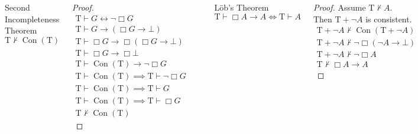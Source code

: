 \documentclass[UTF8,11pt,colorlinks,compress,openany]{beamer}%
\begin{document}
\begin{frame}\frametitle{}
\setlength\abovedisplayskip{0pt}
\setlength\belowdisplayskip{0pt}
	\begin{columns}
		\begin{block}{Second Incompleteness Theorem}
			\[\mathrm{T}\nvdash\operatorname{Con}(\mathrm{T})\]
		\end{block}
		\vspace{-1ex}
		\begin{proof}
			\begin{gather*}
			\mathrm{T}\vdash G\leftrightarrow\neg\Box G\\
			\mathrm{T}\vdash G\to(\Box G\to\bot)\\
			\mathrm{T}\vdash\Box G\to\Box (\Box G\to\bot)\\
			\mathrm{T}\vdash\Box G\to\Box \bot\\
			\mathrm{T}\vdash\operatorname{Con}(\mathrm{T})\to\neg\Box G\\
			\mathrm{T}\vdash\operatorname{Con}(\mathrm{T})\implies\mathrm{T}\vdash\neg\Box G\\
			\mathrm{T}\vdash\operatorname{Con}(\mathrm{T})\implies\mathrm{T}\vdash G\\
			\mathrm{T}\vdash\operatorname{Con}(\mathrm{T})\implies\mathrm{T}\vdash\Box G\\
			\mathrm{T}\nvdash\operatorname{Con}(\mathrm{T})
			\end{gather*}
		\end{proof}
		\begin{center}
		\end{center}
		\begin{block}{L\"ob's Theorem}
			\[\mathrm{T}\vdash\Box A\to A\iff\mathrm{T}\vdash A\]
		\end{block}
		\begin{proof}
			Assume $\mathrm{T}\nvdash A$.\\
			Then $\mathrm{T}+\neg A$ is consistent.
			\begin{gather*}
			\mathrm{T}+\neg A\nvdash\operatorname{Con}(\mathrm{T}+\neg A)\\
			\mathrm{T}+\neg A\nvdash\neg\Box (\neg A\to\bot)\\
			\mathrm{T}+\neg A\nvdash\neg\Box A\\
			\mathrm{T}\nvdash\Box A\to A
			\end{gather*}
		\end{proof}
	\end{columns}
\end{frame}
\end{document}
